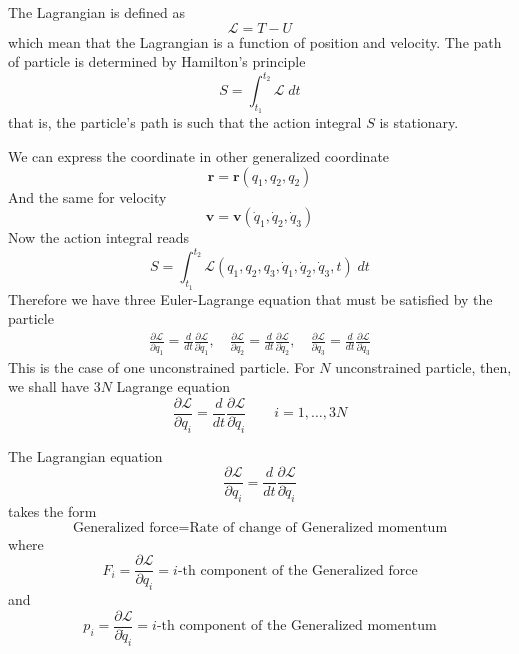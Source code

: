 \documentclass[../../../main.tex]{subfiles}
\begin{document}
The Lagrangian is defined as
\begin{equation*}
	\mathcal{L}=T-U
\end{equation*}
which mean that the Lagrangian is a function of position and velocity.
The path of particle is determined by Hamilton's principle
\begin{equation*}
	S=\int_{t_1}^{t_2}\mathcal{L}\;dt
\end{equation*}
that is, the particle's path is such that the action integral $S$ is stationary.

We can express the coordinate in other generalized coordinate
\begin{equation*}
	\mathbf{r}=\mathbf{r}(q_1,q_2,q_2)
\end{equation*}
And the same for velocity
\begin{equation*}
	\mathbf{v}=\mathbf{v}(\dot{q}_1,\dot{q}_2,\dot{q}_3)
\end{equation*}
Now the action integral reads
\begin{equation*}
	S=\int_{t_1}^{t_2}\mathcal{L}(q_1,q_2,q_3,\dot{q}_1,\dot{q}_2,\dot{q}_3,t)\;dt
\end{equation*}
Therefore we have three Euler-Lagrange equation that must be satisfied by the particle
\begin{align*}
	\frac{\partial \mathcal{L}}{\partial q_1}=\frac{d}{dt}\frac{\partial \mathcal{L}}{\partial \dot{q}_1}, \quad
	\frac{\partial \mathcal{L}}{\partial q_2}=\frac{d}{dt}\frac{\partial \mathcal{L}}{\partial \dot{q}_2}, \quad
	\frac{\partial \mathcal{L}}{\partial q_3}=\frac{d}{dt}\frac{\partial \mathcal{L}}{\partial \dot{q}_3}
\end{align*}
This is the case of one unconstrained particle. For $N$ unconstrained particle, then, we shall have $3N$ Lagrange equation
\begin{equation*}
	\frac{\partial\mathcal{L}}{\partial q_i}=\frac{d}{dt}\frac{\partial \mathcal{L}}{\partial \dot{q}_i}\qquad i=1,\dots,3N
\end{equation*}

The Lagrangian equation
\begin{equation*}
	\frac{\partial \mathcal{L}}{\partial q_i}=\frac{d}{dt}\frac{\partial \mathcal{L}}{\partial \dot{q}_i}
\end{equation*}
takes the form
\begin{equation*}
	\text{Generalized force}=\text{Rate of change of Generalized momentum}
\end{equation*}
where
\begin{equation*}
	F_i=\frac{\partial \mathcal{L}}{\partial q_i}=i\text{-th component of the Generalized force}
\end{equation*}
and
\begin{equation*}
	p_i=\frac{\partial \mathcal{L}}{\partial \dot{q}_i}=i\text{-th component of the Generalized momentum}
\end{equation*}
\end{document}
